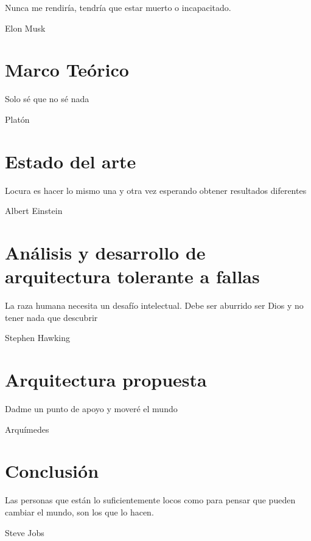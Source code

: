 \documentclass[11pt, a4paper, twoside]{report}
\begin{document}
\setcounter{page}{1}

\epigraph{Nunca me rendiría, tendría que estar muerto o incapacitado.}{Elon Musk}
\chapter{Marco Teórico}\label{chap:marco_teorico}
\epigraph{Solo sé que no sé nada}{Platón}

\chapter{Estado del arte}\label{chap:estado_del_arte}
\epigraph{Locura es hacer lo mismo una y otra vez esperando obtener resultados diferentes}{Albert Einstein}

\chapter{Análisis y desarrollo de arquitectura tolerante a fallas}
\epigraph{La raza humana necesita un desafío intelectual. Debe ser aburrido ser Dios y no tener nada que descubrir}{Stephen Hawking}

\chapter{Arquitectura propuesta}\label{chap:arquitectura_propuesta}
\epigraph{Dadme un punto de apoyo y moveré el mundo}{Arquímedes} 

%
\chapter{Conclusión}
\epigraph{Las personas que están lo suficientemente locos como para pensar que pueden cambiar el mundo, son los que lo hacen.}{Steve Jobs}

%

%
%
%
%
%
\end{document}
